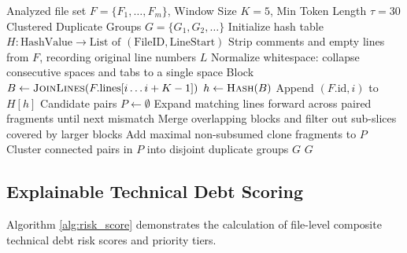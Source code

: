\begin{algorithm}[H]
\caption{Sliding-Window Token Hashing and Maximal Clone Expansion}
\label{alg:clone_detect}
\small
\begin{algorithmic}[1]
\Require Analyzed file set $F = \{F_1, \dots, F_m\}$, Window Size $K = 5$, Min Token Length $\tau = 30$
\Ensure Clustered Duplicate Groups $G = \{G_1, G_2, \dots\}$
\State Initialize hash table $H: \text{HashValue} \to \text{List of } (\text{FileID}, \text{LineStart})$
    \State Strip comments and empty lines from $F$, recording original line numbers $L$
    \State Normalize whitespace: collapse consecutive spaces and tabs to a single space
        \State Block $B \leftarrow \Call{JoinLines}{F.\text{lines}[i \dots i + K - 1]}$
            \State $h \leftarrow \Call{Hash}{B}$ 
            \State Append $(F.\text{id}, i)$ to $H[h]$
        \EndIf
    \EndFor
\EndFor
\State Candidate pairs $P \leftarrow \emptyset$
    \State Expand matching lines forward across paired fragments until next mismatch
    \State Merge overlapping blocks and filter out sub-slices covered by larger blocks
    \State Add maximal non-subsumed clone fragments to $P$
\EndFor
\State Cluster connected pairs in $P$ into disjoint duplicate groups $G$
\State \Return $G$
\end{algorithmic}
\end{algorithm}

\clearpage
\subsection{Explainable Technical Debt Scoring}
Algorithm \ref{alg:risk_score} demonstrates the calculation of file-level composite technical debt risk scores and priority tiers.


